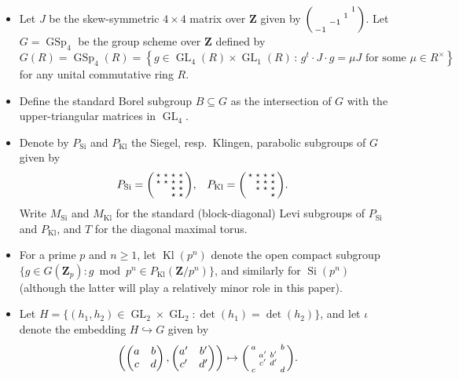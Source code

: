 \documentclass[cjm]{ipart}
\newenvironment{smatrix}{\left( \begin{smallmatrix} } {\end{smallmatrix} \right) }
\theoremstyle{plain}
\theoremstyle{remark}
\DeclareMathOperator{\GL}{GL}
\DeclareMathOperator{\GSp}{GSp}
\DeclareMathOperator{\Kl}{Kl}
\DeclareMathOperator{\Sieg}{Si}
\newcommand{\ZZ}{\mathbf{Z}}
\newcommand{\Zp}{\mathbf{Z}_p}
\numberwithin{equation}{subsection}
\renewcommand{\ge}{\geqslant}
\begin{document}
\begin{itemize}

 \item Let $J$ be the skew-symmetric $4\times 4$ matrix over $\ZZ$ given by $\begin{smatrix} &&& 1\\ 	&&1&\\&-1&&\\-1&&&\end{smatrix}$. Let $G=\GSp_4$ be the group scheme over $\ZZ$ defined by
 \[ G(R)=\GSp_4(R)=\left\{ g \in \GL_4(R)\times \GL_1(R)\, : \, g^t\cdot J\cdot g= \mu J \text{ for some $\mu \in R^\times$} \right\}\]
 for any unital commutative ring $R$.

 \item Define the standard Borel subgroup $B\subseteq G$ as the intersection of $G$ with the upper-triangular matrices in $\GL_4$.

 \item Denote by $P_{\Sieg}$ and $P_{\Kl}$ the Siegel, resp.~Klingen, parabolic subgroups of $G$ given by
 \begin{align*}
  P_{\Sieg}&=\begin{smatrix} \star&\star&\star&\star\\ \star&\star&\star&\star\\&&\star&\star\\&&\star&\star\end{smatrix},&
  P_{\Kl} &= \begin{smatrix} \star&\star&\star&\star\\ &\star&\star&\star\\
  &\star&\star&\star\\ &&&\star\end{smatrix}.
 \end{align*}
Write $M_{\Sieg}$ and $M_{\Kl}$ for the standard (block-diagonal) Levi subgroups of $P_{\Sieg}$ and $P_{\Kl}$, and $T$ for the diagonal maximal torus.

 \item For a prime $p$ and $n \ge 1$, let $\Kl(p^n)$ denote the open compact subgroup $\{g \in G(\Zp): g \bmod {p^n} \in P_{\Kl}(\ZZ/p^n)\}$, and similarly for $\Sieg(p^n)$ (although the latter will play a relatively minor role in this paper).

 \item Let $H = \{ (h_1, h_2) \in \GL_2 \times \GL_2: \det(h_1) = \det(h_2)\}$, and let $\iota$ denote the embedding $H\hookrightarrow G$ given by
 \[ \left(\begin{pmatrix} a & b\\ c & d\end{pmatrix}, \begin{pmatrix} a'& b'\\ c' & d'\end{pmatrix}\right) \mapsto
 \begin{smatrix} a&&& b\\ & a' & b' & \\ & c' & d' & \\ c &&& d\end{smatrix}.\]


\end{itemize}
\end{document}
